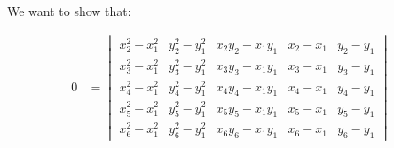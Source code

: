 \documentclass[12pt]{article}
\begin{document}
We want to show that:

\begin{align}
0 &=
    \begin{vmatrix}
        x_2^2 - x_1^2 & y_2^2 - y_1^2 & x_2 y_2 - x_1 y_1 & x_2 - x_1 & y_2 - y_1 \\
        x_3^2 - x_1^2 & y_3^2 - y_1^2 & x_3 y_3 - x_1 y_1 & x_3 - x_1 & y_3 - y_1 \\
        x_4^2 - x_1^2 & y_4^2 - y_1^2 & x_4 y_4 - x_1 y_1 & x_4 - x_1 & y_4 - y_1 \\
        x_5^2 - x_1^2 & y_5^2 - y_1^2 & x_5 y_5 - x_1 y_1 & x_5 - x_1 & y_5 - y_1 \\
        x_6^2 - x_1^2 & y_6^2 - y_1^2 & x_6 y_6 - x_1 y_1 & x_6 - x_1 & y_6 - y_1 
    \end{vmatrix} 
\end{align}

\scriptsize
\end{document}
